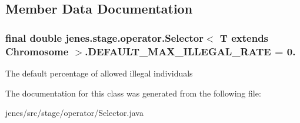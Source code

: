 \subsection{Member Data Documentation}
\hypertarget{classjenes_1_1stage_1_1operator_1_1_selector_3_01_t_01extends_01_chromosome_01_4_a81263464a18d2ee1ecddf41f2e97fd89}{
\subsubsection[{D\-E\-F\-A\-U\-L\-T\-\_\-\-M\-A\-X\-\_\-\-I\-L\-L\-E\-G\-A\-L\-\_\-\-R\-A\-T\-E}]{\setlength{\rightskip}{0pt plus 5cm}final double jenes.\-stage.\-operator.\-Selector$<$ T extends Chromosome $>$.D\-E\-F\-A\-U\-L\-T\-\_\-\-M\-A\-X\-\_\-\-I\-L\-L\-E\-G\-A\-L\-\_\-\-R\-A\-T\-E = 0.\hspace{0.3cm}{\ttfamily [static]}}}\label{classjenes_1_1stage_1_1operator_1_1_selector_3_01_t_01extends_01_chromosome_01_4_a81263464a18d2ee1ecddf41f2e97fd89}
The default percentage of allowed illegal individuals 

The documentation for this class was generated from the following file\-:\begin{DoxyCompactItemize}
\item 
jenes/src/stage/operator/Selector.\-java\end{DoxyCompactItemize}
